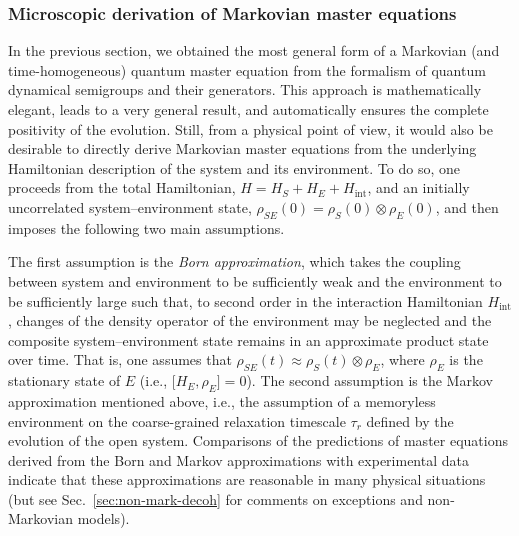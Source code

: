 \documentclass[3p,sort&compress]{elsarticle}
\newcommand{\op}[1]{#1}
\begin{document}
\subsubsection{\label{sec:micr-deriv-mark}Microscopic derivation of Markovian master equations}

In the previous section, we obtained the most general form of a Markovian (and time-homogeneous) quantum master equation from the formalism of quantum dynamical semigroups and their generators. This approach is mathematically elegant, leads to a very general result, and automatically ensures the complete positivity of the evolution. Still, from a physical point of view, it would also be desirable to directly derive Markovian master equations from the underlying Hamiltonian description of the system and its environment. To do so, one proceeds from the total Hamiltonian, $\op{H}=\op{H}_S+\op{H}_E+\op{H}_\text{int}$, and an initially uncorrelated system--environment state, $\op{\rho}_{SE}(0)=\op{\rho}_{S}(0)\otimes \op{\rho}_{E}(0)$, and then imposes the following two main assumptions. 

The first assumption is the \emph{Born approximation}, which takes the coupling between system and environment to be sufficiently weak and the environment to be sufficiently large such that, to second order in the interaction Hamiltonian $\op{H}_\text{int}$, changes of the density operator of the environment may be neglected and the composite system--environment state remains in an approximate product state over time. That is, one assumes that $\op{\rho}_{SE}(t) \approx \op{\rho}_S(t) \otimes \op{\rho}_E$, where $\op{\rho}_E$ is the stationary state of $E$ (i.e., $\bigl[ \op{H}_E, \op{\rho}_E \bigr] = 0$). The second assumption is the Markov approximation mentioned above, i.e., the assumption of a memoryless environment on the coarse-grained relaxation timescale $\tau_r$ defined by the evolution of the open system. Comparisons of the predictions of master equations derived from the Born and Markov approximations with experimental data indicate that these approximations are reasonable in many physical situations (but see Sec.~\ref{sec:non-mark-decoh} for comments on exceptions and non-Markovian models). 
\end{document}
